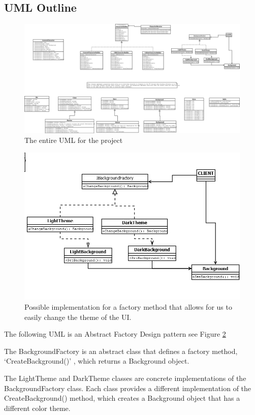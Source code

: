 \documentclass[10pt,conference,onecolumn,compsoc]{IEEEtran}
\begin{document}
\subsection{UML Outline}
\begin{figure}[ht!]
\includegraphics[scale=0.19]{RPGCharacterCreatorUML.png}
\caption{The entire UML for the project}
\label{fullUML}
\end{figure}
\begin{figure}[ht!]
\includegraphics[scale=0.4]{factMethod.png}
\caption{Possible implementation for a factory method that allows for us to easily change the theme of the UI.}
\label{themeFact}
\end{figure}

The following UML is an Abstract Factory Design pattern see Figure \ref{themeFact}

The BackgroundFactory is an abstract class that defines a factory method, ‘CreateBackground()’ , which returns a Background object.

The LightTheme and DarkTheme classes are concrete implementations of the BackgroundFactory class. Each class provides a different implementation of the CreateBackground() method, which creates a Background object that has a different color theme.
\end{document}
